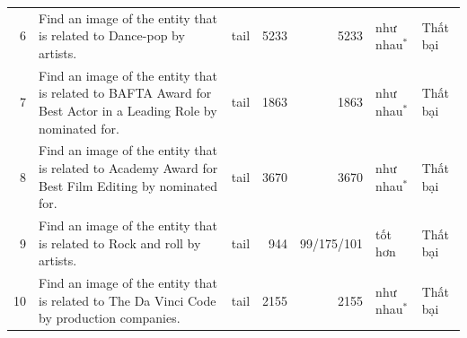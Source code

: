 \begin{table}[!t]
\begin{tabularx}{\linewidth}{@{}rYlrrll@{}}
6 & Find an image of the entity that is related to Dance-pop by artists. & tail & 5233 & 5233 & như nhau$^{*}$ & Thất bại\\
7 & Find an image of the entity that is related to BAFTA Award for Best Actor in a Leading Role by nominated for. & tail & 1863 & 1863 & như nhau$^{*}$ & Thất bại\\
8 & Find an image of the entity that is related to Academy Award for Best Film Editing by nominated for. & tail & 3670 & 3670 & như nhau$^{*}$ & Thất bại\\
9 & Find an image of the entity that is related to Rock and roll by artists. & tail & 944 & 99/175/101 & tốt hơn & Thất bại\\
10 & Find an image of the entity that is related to The Da Vinci Code by production companies. & tail & 2155 & 2155 & như nhau$^{*}$ & Thất bại\\
\bottomrule
\end{tabularx}
\par{}
\end{table}
